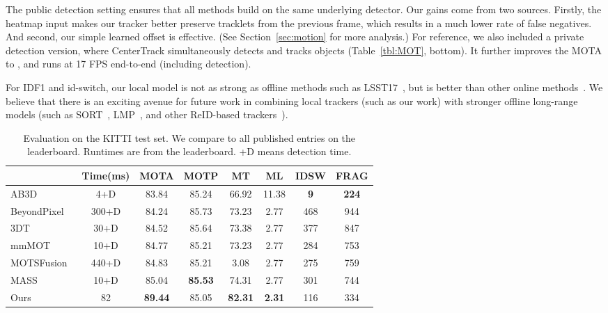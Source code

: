 \documentclass[runningheads]{llncs}
\newcommand{\lbltab}[1]{\label{tbl:#1}}
\newcommand{\refsec}[1]{Section~\ref{sec:#1}}
\newcommand{\reftab}[1]{Table~\ref{tbl:#1}}
\begin{document}
The public detection setting ensures that all methods build on the same underlying detector.
Our gains come from two sources.
Firstly, the heatmap input makes our tracker better preserve tracklets from the previous frame, which results in a much lower rate of false negatives.
And second, our simple learned offset is effective. (See \refsec{motion} for more analysis.)
For reference, we also included a private detection version, where CenterTrack simultaneously detects and tracks objects (\reftab{MOT}, bottom).
It further improves the MOTA to , and runs at 17 FPS end-to-end (including detection).

For IDF1 and id-switch, our local model is not as strong as offline methods such as LSST17~\cite{feng2019multi}, but is better than other online methods~\cite{bergmann2019tracking}. We believe that there is an exciting avenue for future work in combining local trackers (such as our work) with stronger offline long-range models (such as SORT~\cite{Bewley2016_sort}, LMP~\cite{tang2017multiple}, and other ReID-based trackers~\cite{yu2016poi,xu2019spatial}).

\begin{table}[t]
\center 
\footnotesize
\begin{tabular}{@{}l@{\ \ }c@{\ \ }c@{\ \ }c@{\ \ }c@{\ \ }c@{\ \ }c@{\ \ }c@{\ \ }@{}}
\toprule
 & Time(ms) & MOTA  & MOTP  & MT  & ML  & IDSW  & FRAG  \\
\midrule
AB3D~\cite{Weng2019_3dmot} & 4+D & 83.84 & 85.24 & 66.92 & 11.38 & \textbf{9} & \textbf{224} \\
BeyondPixel~\cite{sharma2018beyond} & 300+D & 84.24 & 85.73 & 73.23 & 2.77 & 468 & 944\\
3DT~\cite{Hu3DT19} & 30+D & 84.52 & 85.64 & 73.38 & 2.77 & 377 & 847 \\
mmMOT~\cite{Zhang_2019_ICCV} & 10+D & 84.77 & 85.21 & 73.23 & 2.77 & 284 & 753 \\
MOTSFusion~\cite{luiten2019track} & 440+D & 84.83 & 85.21 & 3.08 & 2.77 & 275 & 759 \\
MASS~\cite{karunasekera2019multiple} & 10+D & 85.04 & \textbf{85.53} & 74.31 & 2.77 & 301 & 744 \\
Ours & 82 & \textbf{89.44} & 85.05 & \textbf{82.31} & \textbf{2.31} & 116 & 334 \\
\bottomrule
\end{tabular}
\caption{Evaluation on the KITTI test set. We compare to all published entries on the leaderboard. Runtimes are from the leaderboard. 
+D means detection time.}
\lbltab{sota:kitti}
\vspace{-1.25em}
\end{table}
\end{document}
